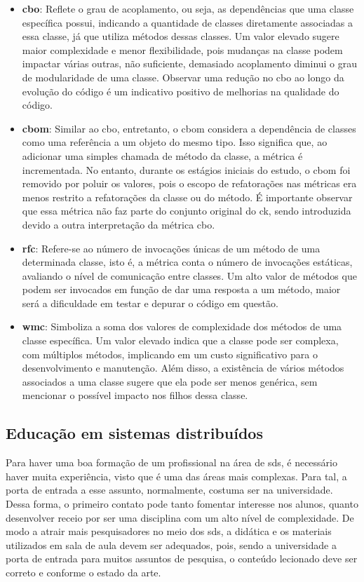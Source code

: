 \begin{itemize}
    \item \textbf{\gls{cbo}}: Reflete o grau de acoplamento, ou seja, as dependências que uma classe específica possui, indicando a quantidade de classes diretamente associadas a essa classe, já que utiliza métodos dessas classes. Um valor elevado sugere maior complexidade e menor flexibilidade, pois mudanças na classe podem impactar várias outras, não suficiente, demasiado acoplamento diminui o grau de modularidade de uma classe. Observar uma redução no \gls{cbo} ao longo da evolução do código é um indicativo positivo de melhorias na qualidade do código.
    \item \textbf{\gls{cbom}}: Similar ao \gls{cbo}, entretanto, o \gls{cbom} considera a dependência de classes como uma referência a um objeto do mesmo tipo. Isso significa que, ao adicionar uma simples chamada de método da classe, a métrica é incrementada. No entanto, durante os estágios iniciais do estudo, o \gls{cbom} foi removido por poluir os valores, pois o escopo de refatorações nas métricas era menos restrito a refatorações da classe ou do método. É importante observar que essa métrica não faz parte do conjunto original do \gls{ck}, sendo introduzida devido a outra interpretação da métrica \gls{cbo}.
    \item \textbf{\gls{rfc}}: Refere-se ao número de invocações únicas de um método de uma determinada classe, isto é, a métrica conta o número de invocações estáticas, avaliando o nível de comunicação entre classes. Um alto valor de métodos que podem ser invocados em função de dar uma resposta a um método, maior será a dificuldade em testar e depurar o código em questão.
    \item \textbf{\gls{wmc}}: Simboliza a soma dos valores de complexidade dos métodos de uma classe específica. Um valor elevado indica que a classe pode ser complexa, com múltiplos métodos, implicando em um custo significativo para o desenvolvimento e manutenção. Além disso, a existência de vários métodos associados a uma classe sugere que ela pode ser menos genérica, sem mencionar o possível impacto nos filhos dessa classe.
\end{itemize}

\subsection{Educação em sistemas distribuídos}
Para haver uma boa formação de um profissional na área de \gls{sds}, é necessário haver muita experiência, visto que é uma das áreas mais complexas. Para tal, a porta de entrada a esse assunto, normalmente, costuma ser na universidade. Dessa forma, o primeiro contato pode tanto fomentar interesse nos alunos, quanto desenvolver receio por ser uma disciplina com um alto nível de complexidade. De modo a atrair mais pesquisadores no meio dos \gls{sds}, a didática e os materiais utilizados em sala de aula devem ser adequados, pois, sendo a universidade a porta de entrada para muitos assuntos de pesquisa, o conteúdo lecionado deve ser correto e conforme o estado da arte. 


